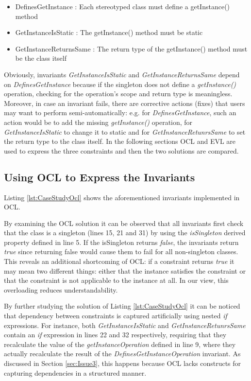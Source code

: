 \begin{itemize}
	\item DefinesGetInstance : Each stereotyped class must define a getInstance() method
	\item GetInstanceIsStatic : The getInstance() method must be static
	\item GetInstanceReturnsSame : The return type of the getInstance() method must be the class itself 
\end{itemize}

Obviously, invariants \emph{GetInstanceIsStatic} and \emph{GetInstanceReturnsSame} depend on \emph{DefinesGetInstance} because if the singleton does not define a \emph{getInstance()} operation, checking for the operation's scope and return type is meaningless. Moreover, in case an invariant fails, there are corrective actions (fixes) that users may want to perform semi-automatically: e.g. for \emph{DefinesGetInstance}, such an action would be to add the missing \emph{getInstance()} operation, for \emph{GetInstanceIsStatic} to change it to static and for \emph{GetInstanceRetunrsSame} to set the return type to the class itself. In the following sections OCL and EVL are used to express the three constraints and then the two solutions are compared.

\subsection{Using OCL to Express the Invariants}

Listing \ref{lst:CaseStudyOcl} shows the aforementioned invariants implemented in OCL.



By examining the OCL solution it can be observed that all invariants first check that the class is a singleton (lines 15, 21 and 31) by using the \emph{isSingleton} derived property defined in line 5. If the isSingleton returns \emph{false}, the invariants return \emph{true} since returning false would cause them to fail for all non-singleton classes. This reveals an additional shortcoming of OCL: if a constraint returns \emph{true} it may mean two different things: either that the instance satisfies the constraint or that the constraint is not applicable to the instance at all. In our view, this overloading reduces understandability.

By further studying the solution of Listing \ref{lst:CaseStudyOcl} it can be noticed that dependency between constraints is captured artificially using nested \emph{if} expressions. For instance, both \emph{GetInstanceIsStatic} and \emph{GetInstanceRetunrsSame} contain an \emph{if} expression in lines 22 and 32 respectively, requiring that they recalculate the value of the \emph{getInstanceOperation} defined in line 9, where they actually recalculate the result of the \emph{DefinesGetInstanceOperation} invariant. As discussed in Section \ref{sec:Issue3}, this happens because OCL lacks constructs for capturing dependencies in a structured manner.

